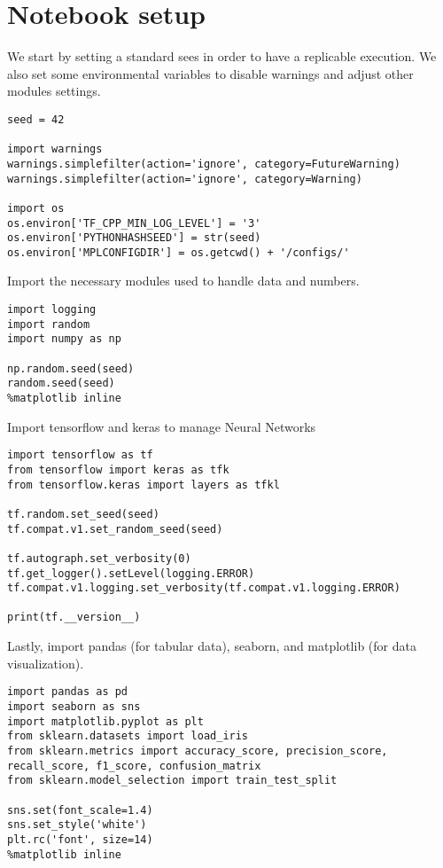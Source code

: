 \section{Notebook setup}

We start by setting a standard sees in order to have a replicable execution.
We also set some environmental variables to disable warnings and adjust other modules settings.  
\begin{lstlisting}[style=Python]
seed = 42

import warnings
warnings.simplefilter(action='ignore', category=FutureWarning)
warnings.simplefilter(action='ignore', category=Warning)

import os
os.environ['TF_CPP_MIN_LOG_LEVEL'] = '3'
os.environ['PYTHONHASHSEED'] = str(seed)
os.environ['MPLCONFIGDIR'] = os.getcwd() + '/configs/'
\end{lstlisting}
Import the necessary modules used to handle data and numbers.
\begin{lstlisting}[style=Python]
import logging
import random
import numpy as np

np.random.seed(seed)
random.seed(seed)
%matplotlib inline
\end{lstlisting}
Import tensorflow and keras to manage Neural Networks
\begin{lstlisting}[style=Python]
import tensorflow as tf
from tensorflow import keras as tfk
from tensorflow.keras import layers as tfkl

tf.random.set_seed(seed)
tf.compat.v1.set_random_seed(seed)

tf.autograph.set_verbosity(0)
tf.get_logger().setLevel(logging.ERROR)
tf.compat.v1.logging.set_verbosity(tf.compat.v1.logging.ERROR)

print(tf.__version__)
\end{lstlisting}
Lastly, import pandas (for tabular data), seaborn, and matplotlib (for data visualization).
\begin{lstlisting}[style=Python]
import pandas as pd
import seaborn as sns
import matplotlib.pyplot as plt
from sklearn.datasets import load_iris
from sklearn.metrics import accuracy_score, precision_score, recall_score, f1_score, confusion_matrix
from sklearn.model_selection import train_test_split

sns.set(font_scale=1.4)
sns.set_style('white')
plt.rc('font', size=14)
%matplotlib inline
\end{lstlisting}